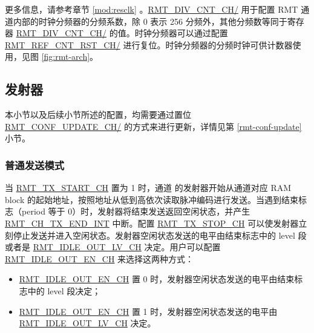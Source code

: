 \documentclass[main\_\_CN.tex]{subfiles}
\begin{document}
更多信息，请参考章节 \ref{mod:resclk} \textit{}。\hyperref[fielddesc:RMTDIVCNTCHN]{RMT\_DIV\_CNT\_CH/} 用于配置 RMT 通道内部的时钟分频器的分频系数，除 0 表示 256 分频外，其他分频数等同于寄存器 \hyperref[fielddesc:RMTDIVCNTCHN]{RMT\_DIV\_CNT\_CH/} 的值。时钟分频器可以通过配置 \hyperref[fielddesc:RMTREFCNTRSTCHN]{RMT\_REF\_CNT\_RST\_CH/} 进行复位。时钟分频器的分频时钟可供计数器使用，见图 \ref{fig:rmt-arch}。

\subsection{发射器}
\vspace{0.4cm}

\begin{tiplisting}
本小节以及后续小节所述的配置，均需要通过置位 \hyperref[fielddesc:RMTCONFUPDATECHN]{RMT\_CONF\_UPDATE\_CH/} 的方式来进行更新，详情见第 \ref{rmt-conf-update} 小节。
\end{tiplisting}
\vspace{-1em}

\subsubsection{普通发送模式}\label{sec:normal-tx-mode}

当 \hyperref[fielddesc:RMTTXSTARTCHN]{RMT\_TX\_START\_CH} 置为 1 时，通道  的发射器开始从通道对应 RAM block 的起始地址，按照地址从低到高依次读取脉冲编码进行发送。当遇到结束标志（period 等于 0）时，发射器将结束发送返回空闲状态，并产生 \hyperref[int:RMTCHNTXENDINT]{RMT\_CH\_TX\_END\_INT} 中断。配置 \hyperref[fielddesc:RMTTXSTOPCHN]{RMT\_TX\_STOP\_CH} 可以使发射器立刻停止发送并进入空闲状态。发射器空闲状态发送的电平由结束标志中的 level 段或者是 \hyperref[fielddesc:RMTIDLEOUTLVCHN]{RMT\_IDLE\_OUT\_LV\_CH} 决定。用户可以配置 \hyperref[fielddesc:RMTIDLEOUTENCHN]{RMT\_IDLE\_OUT\_EN\_CH} 来选择这两种方式：
\begin{itemize}
    \item \hyperref[fielddesc:RMTIDLEOUTENCHN]{RMT\_IDLE\_OUT\_EN\_CH} 置 0 时，发射器空闲状态发送的电平由结束标志中的 level 段决定；
    \item \hyperref[fielddesc:RMTIDLEOUTENCHN]{RMT\_IDLE\_OUT\_EN\_CH} 置 1 时，发射器空闲状态发送的电平由 \hyperref[fielddesc:RMTIDLEOUTLVCHN]{RMT\_IDLE\_OUT\_LV\_CH} 决定。
\end{itemize}
\end{document}
